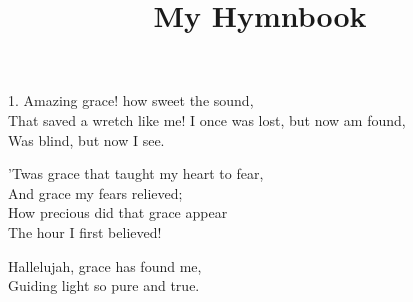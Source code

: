 \documentclass[12pt]{article}
\title{My Hymnbook}
\author{}
\date{}
\begin{document}
\maketitle
\tableofcontents
\newpage


\begin{stanza}
1. Amazing grace! how sweet the sound,\\
That saved a wretch like me!
I once was lost, but now am found,\\
Was blind, but now I see.
\end{stanza}

\begin{stanza}
’Twas grace that taught my heart to fear,\\
And grace my fears relieved;\\
How precious did that grace appear\\
The hour I first believed!
\end{stanza}

\begin{chorus}
Hallelujah, grace has found me,\\
Guiding light so pure and true.
\end{chorus}
\end{document}
